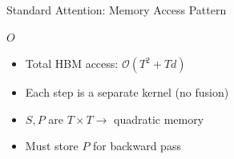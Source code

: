 \begin{frame}{Standard Attention: Memory Access Pattern}

      \begin{algorithm}[H]
        \caption{Standard Attention \quad {\small\textcolor{loadcol}{$\blacksquare$ Load}} \quad {\small\textcolor{compcol}{$\blacksquare$ Compute}} \quad {\small\textcolor{storecol}{$\blacksquare$ Store}}}
         
        \;
         
         
        \;
         
         
        \;
         
        \Return $O$\;
      \end{algorithm}

      \vspace{0.3em}
      \begin{itemize}
        \item Total HBM access: $\mathcal{O}(T^2 + Td)$
        \item Each step is a separate kernel (no fusion)
        \item $S, P$ are $T \times T \to$ quadratic memory
        \item Must store $P$ for backward pass
      \end{itemize}

\end{frame}

